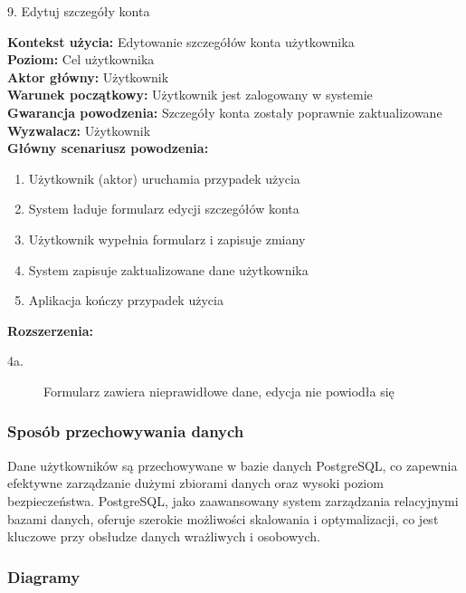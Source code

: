 \clearpage

{\noindent \bf{\small 9. Edytuj szczegóły konta\par}}
\vspace{0.5cm}
{\noindent \bf Kontekst użycia: } Edytowanie szczegółów konta użytkownika\\
{\bf Poziom: } Cel użytkownika\\
{\bf Aktor główny: } Użytkownik\\
{\bf Warunek początkowy: } Użytkownik jest zalogowany w systemie\\
{\bf Gwarancja powodzenia: } Szczegóły konta zostały poprawnie zaktualizowane\\
{\bf Wyzwalacz: } Użytkownik\\
{\bf Główny scenariusz powodzenia: }
\begin{enumerate}
    \item Użytkownik (aktor) uruchamia przypadek użycia
    \item System ładuje formularz edycji szczegółów konta
    \item Użytkownik wypełnia formularz i zapisuje zmiany
    \item System zapisuje zaktualizowane dane użytkownika
    \item Aplikacja kończy przypadek użycia
\end{enumerate}
{\noindent \bf Rozszerzenia: }
\begin{description}
    \item[4a.] Formularz zawiera nieprawidłowe dane, edycja nie powiodła się
\end{description}

\subsubsection{Sposób przechowywania danych}
Dane użytkowników są przechowywane w bazie danych PostgreSQL, co zapewnia efektywne zarządzanie dużymi zbiorami danych oraz wysoki poziom bezpieczeństwa. PostgreSQL, jako zaawansowany system zarządzania relacyjnymi bazami danych, oferuje szerokie możliwości skalowania i optymalizacji, co jest kluczowe przy obsłudze danych wrażliwych i osobowych.

\clearpage

\subsubsection{Diagramy}

